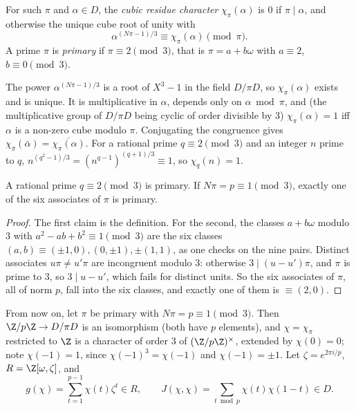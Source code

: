 \begin{definition}
For such $\pi$ and $\alpha\in D$, the \emph{cubic residue character} $\chi_\pi(\alpha)$ is $0$ if $\pi\mid\alpha$, and otherwise the unique cube root of
unity with
\[
\alpha^{(N\pi-1)/3}\equiv\chi_\pi(\alpha)\pmod\pi.
\]
A prime $\pi$ is \emph{primary} if $\pi\equiv2\pmod3$, that is $\pi=a+b\omega$ with $a\equiv2$, $b\equiv0\pmod3$.
\end{definition}

The power $\alpha^{(N\pi-1)/3}$ is a root of $X^3-1$ in the field $D/\pi D$, so $\chi_\pi(\alpha)$ exists and is unique. It is multiplicative in $\alpha$,
depends only on $\alpha\bmod\pi$, and (the multiplicative group of $D/\pi D$ being cyclic of order divisible by $3$) $\chi_\pi(\alpha)=1$ iff $\alpha$ is a
non-zero cube modulo $\pi$. Conjugating the congruence gives $\chi_{\bar\pi}(\bar\alpha)=\overline{\chi_\pi(\alpha)}$. For a rational prime $q\equiv2\pmod3$
and an integer $n$ prime to $q$, $n^{(q^2-1)/3}=(n^{q-1})^{(q+1)/3}\equiv1$, so $\chi_q(n)=1$.

\begin{lemma}\label{lem:primary}
A rational prime $q\equiv2\pmod3$ is primary. If $N\pi=p\equiv1\pmod3$, exactly one of the six associates of $\pi$ is primary.
\end{lemma}
\begin{proof}
The first claim is the definition. For the second, the classes $a+b\omega$ modulo $3$ with $a^2-ab+b^2\equiv1\pmod3$ are the six classes
$(a,b)\equiv(\pm1,0),(0,\pm1),\pm(1,1)$, as one checks on the nine pairs. Distinct associates $u\pi\ne u'\pi$ are incongruent modulo $3$: otherwise $3\mid(u-u')\pi$,
and $\pi$ is prime to $3$, so $3\mid u-u'$, which fails for distinct units. So the six associates of $\pi$, all of norm $p$, fall into the six classes, and
exactly one of them is $\equiv(2,0)$.
\end{proof}

From now on, let $\pi$ be primary with $N\pi=p\equiv1\pmod3$. Then $\Z/p\Z\to D/\pi D$ is an isomorphism (both have $p$ elements), and $\chi=\chi_\pi$
restricted to $\Z$ is a character of order $3$ of $(\Z/p\Z)^\times$, extended by $\chi(0)=0$; note $\chi(-1)=1$, since $\chi(-1)^3=\chi(-1)$ and
$\chi(-1)=\pm1$. Let $\zeta=e^{2\pi i/p}$, $R=\Z[\omega,\zeta]$, and
\[
g(\chi)=\sum_{t=1}^{p-1}\chi(t)\zeta^t\in R,\qquad J(\chi,\chi)=\sum_{t\bmod p}\chi(t)\chi(1-t)\in D.
\]

